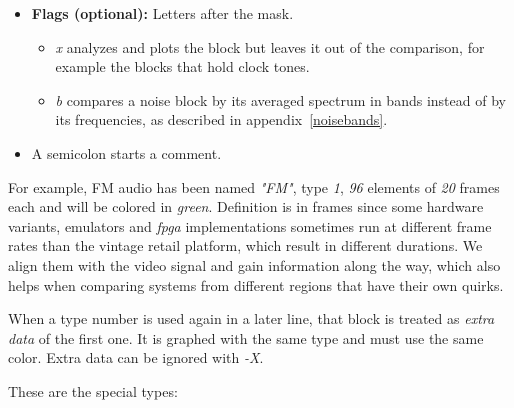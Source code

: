\documentclass[10pt,a4paper]{report}
\newcommand{\ac}[1]{\textit{\mbox{\acrshort{#1}}}}
\begin{document}
\begin{appendices}
\begin{itemize}
	\item \textbf{Flags (optional):} Letters after the mask.
	\begin{itemize}
		\item \textit{x} analyzes and plots the block but leaves it out of the comparison, for example the blocks that hold clock tones.
		\item \textit{b} compares a noise block by its averaged spectrum in bands instead of by its frequencies, as described in appendix~\ref{noisebands}.
	\end{itemize}
	\item A semicolon starts a comment.
\end{itemize}

For example, FM audio has been named \textit{"FM"}, type \textit{1}, \textit{96} elements of \textit{20} frames each and will be colored in \textit{green}. Definition is in frames since some hardware variants, emulators and \ac{fpga} implementations sometimes run at different frame rates than the vintage retail platform, which result in different durations. We align them with the video signal and gain information along the way, which also helps when comparing systems from different regions that have their own quirks.

When a type number is used again in a later line, that block is treated as \textit{extra data} of the first one. It is graphed with the same type and must use the same color. Extra data can be ignored with \textit{-X}.

These are the special types:


\end{appendices}
\end{document}
